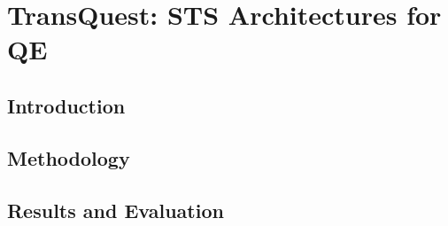 \chapter{\label{cha:transquest}TransQuest: STS Architectures for QE}

\section{Introduction}
\cite{conneau-etal-2020-unsupervised}
\section{Methodology}

\section{Results and Evaluation}